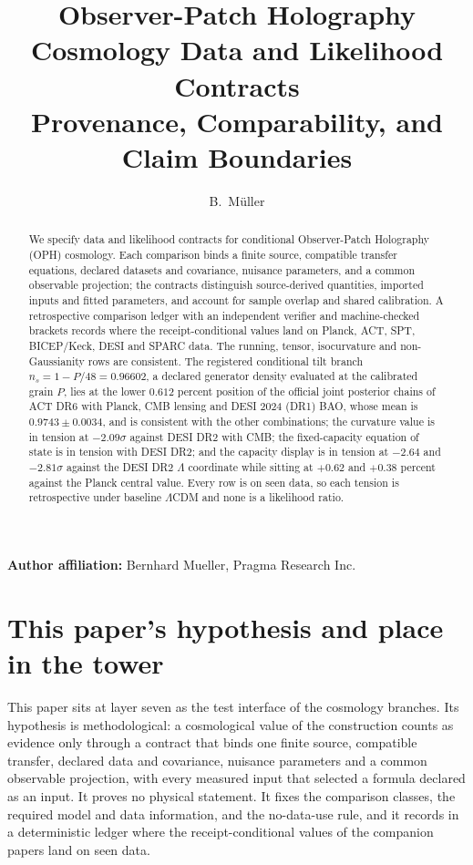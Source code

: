 \documentclass[11pt]{article}
\title{Observer-Patch Holography Cosmology Data and Likelihood Contracts\\
\large Provenance, Comparability, and Claim Boundaries}
\author{B.\ M\"uller}
\date{\OPHPaperReleaseDate}
\begin{document}
\maketitle
\OPHPaperReleaseBanner

\begin{center}
\small\textbf{Author affiliation:} Bernhard Mueller, Pragma Research Inc.
\end{center}

\begin{abstract}
We specify data and likelihood contracts for conditional Observer-Patch
Holography (OPH) cosmology. Each comparison binds a finite source, compatible
transfer equations, declared datasets and covariance, nuisance parameters,
and a common observable projection; the contracts distinguish source-derived
quantities, imported inputs and fitted parameters, and account for sample
overlap and shared calibration. A retrospective comparison ledger with an
independent verifier and machine-checked brackets records where the
receipt-conditional values land on Planck, ACT, SPT, BICEP/Keck, DESI and
SPARC data. The running, tensor, isocurvature and non-Gaussianity rows are
consistent. The registered conditional tilt branch \(n_s=1-P/48=0.96602\),
a declared generator density evaluated at the calibrated grain \(P\), lies at the lower \(0.612\) percent position
of the official joint posterior chains of ACT DR6 with Planck, CMB lensing
and DESI 2024 (DR1) BAO, whose mean is \(0.9743\pm0.0034\), and is
consistent with the other combinations; the curvature value is in tension at
\(-2.09\sigma\) against DESI DR2 with CMB; the fixed-capacity equation of
state is in tension with DESI DR2; and the capacity display is in tension at
\(-2.64\) and \(-2.81\sigma\) against the DESI DR2 \(\Lambda\) coordinate
while sitting at \(+0.62\) and \(+0.38\) percent against the Planck central
value. Every row is on seen data, so each tension is retrospective under
baseline \(\Lambda\)CDM and none is a likelihood ratio.
\end{abstract}



\section*{This paper's hypothesis and place in the tower}

This paper sits at layer seven as the test interface of the cosmology
branches. Its hypothesis is methodological: a cosmological value of the
construction counts as evidence only through a contract that binds one
finite source, compatible transfer, declared data and covariance, nuisance
parameters and a common observable projection, with every measured input
that selected a formula declared as an input. It proves no physical
statement. It fixes the comparison classes, the required model and data
information, and the no-data-use rule, and it records in a deterministic
ledger where the receipt-conditional values of the companion papers land on
seen data.
\end{document}
